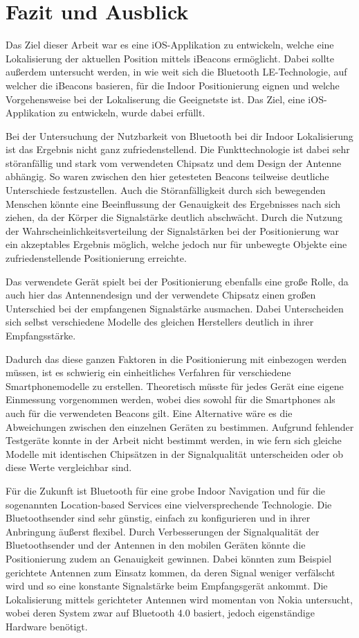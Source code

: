 \chapter{Fazit und Ausblick}
\label{chap:resume}

Das Ziel dieser Arbeit war es eine iOS-Applikation zu entwickeln, welche eine Lokalisierung der aktuellen Position mittels iBeacons ermöglicht. Dabei sollte außerdem untersucht werden, in wie weit sich die Bluetooth LE-Technologie, auf welcher die iBeacons basieren, für die Indoor Positionierung eignen und welche Vorgehensweise bei der Lokaliserung die Geeignetste ist. Das Ziel, eine iOS-Applikation zu entwickeln, wurde dabei erfüllt. 

Bei der Untersuchung der Nutzbarkeit von Bluetooth bei dir Indoor Lokalisierung ist das Ergebnis nicht ganz zufriedenstellend. Die Funkttechnologie ist dabei sehr störanfällig und stark vom verwendeten Chipsatz und dem Design der Antenne abhängig. So waren zwischen den hier getesteten Beacons teilweise deutliche Unterschiede festzustellen. Auch die Störanfälligkeit durch sich bewegenden Menschen könnte eine Beeinflussung der Genauigkeit des Ergebnisses nach sich ziehen, da der Körper die Signalstärke deutlich abschwächt. Durch die Nutzung der Wahrscheinlichkeitsverteilung der Signalstärken bei der Positionierung war ein akzeptables Ergebnis möglich, welche jedoch nur für unbewegte Objekte eine zufriedenstellende Positionierung erreichte.

Das verwendete Gerät spielt bei der Positionierung ebenfalls eine große Rolle, da auch hier das Antennendesign und der verwendete Chipsatz einen großen Unterschied bei der empfangenen Signalstärke ausmachen. Dabei Unterscheiden sich selbst verschiedene Modelle des gleichen Herstellers deutlich in ihrer Empfangsstärke. 

Dadurch das diese ganzen Faktoren in die Positionierung mit einbezogen werden müssen, ist es schwierig ein einheitliches Verfahren für verschiedene Smartphonemodelle zu erstellen. Theoretisch müsste für jedes Gerät eine eigene Einmessung vorgenommen werden, wobei dies sowohl für die Smartphones als auch für die verwendeten Beacons gilt.
Eine Alternative wäre es die Abweichungen zwischen den einzelnen Geräten zu bestimmen. Aufgrund fehlender Testgeräte konnte in der Arbeit nicht bestimmt werden, in wie fern sich gleiche Modelle mit identischen Chipsätzen in der Signalqualität unterscheiden oder ob diese Werte vergleichbar sind.

Für die Zukunft ist Bluetooth für eine grobe Indoor Navigation und für die sogenannten Location-based Services eine vielversprechende Technologie. Die Bluetoothsender sind sehr günstig, einfach zu konfigurieren und in ihrer Anbringung äußerst flexibel. Durch Verbesserungen der Signalqualität der Bluetoothsender und der Antennen in den mobilen Geräten könnte die Positionierung zudem an Genauigkeit gewinnen. Dabei könnten zum Beispiel gerichtete Antennen zum Einsatz kommen, da deren Signal weniger verfälscht wird und so eine konstante Signalstärke beim Empfangsgerät ankommt. Die Lokalisierung mittels gerichteter Antennen wird momentan von Nokia untersucht, wobei deren System zwar auf Bluetooth 4.0 basiert, jedoch eigenständige Hardware benötigt.


